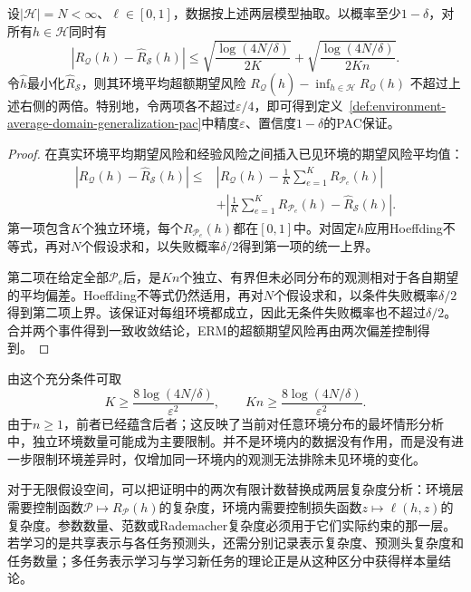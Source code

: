 \begin{theorem}[随机环境中的一致收敛与可学习性]
\label{thm:dg-two-level-sample}
设$|\mathcal H|=N<\infty$、$\ell\in[0,1]$，数据按上述两层模型抽取。以概率至少$1-\delta$，对所有$h\in\mathcal H$同时有
\begin{equation}
 |R_{\mathcal Q}(h)-\widehat R_{\mathcal S}(h)|
 \leq\sqrt{\frac{\log(4N/\delta)}{2K}}
      +\sqrt{\frac{\log(4N/\delta)}{2Kn}}.
 \label{eq:dg-two-level-uniform}
\end{equation}
令$\widehat h$最小化$\widehat R_{\mathcal S}$，则其环境平均超额期望风险
$R_{\mathcal Q}(\widehat h)-\inf_{h\in\mathcal H}R_{\mathcal Q}(h)$
不超过上述右侧的两倍。特别地，令两项各不超过$\varepsilon/4$，即可得到定义~\ref{def:environment-average-domain-generalization-pac}中精度$\varepsilon$、置信度$1-\delta$的PAC保证。
\end{theorem}
\begin{proof}
在真实环境平均期望风险和经验风险之间插入已见环境的期望风险平均值：
\begin{align*}
 |R_{\mathcal Q}(h)-\widehat R_{\mathcal S}(h)|
 \leq{}&\left|R_{\mathcal Q}(h)-\frac1K\sum_{e=1}^K R_{\mathcal P_e}(h)\right|\\
 &+\left|\frac1K\sum_{e=1}^K R_{\mathcal P_e}(h)-\widehat R_{\mathcal S}(h)\right|.
\end{align*}
第一项包含$K$个独立环境，每个$R_{\mathcal P_e}(h)$都在$[0,1]$中。对固定$h$应用Hoeffding不等式，再对$N$个假设求和，以失败概率$\delta/2$得到第一项的统一上界。

第二项在给定全部$\mathcal P_e$后，是$Kn$个独立、有界但未必同分布的观测相对于各自期望的平均偏差。Hoeffding不等式仍然适用，再对$N$个假设求和，以条件失败概率$\delta/2$得到第二项上界。该保证对每组环境都成立，因此无条件失败概率也不超过$\delta/2$。合并两个事件得到一致收敛结论，ERM的超额期望风险再由两次偏差控制得到。
\end{proof}

由这个充分条件可取
\[
 K\geq\frac{8\log(4N/\delta)}{\varepsilon^2},\qquad
 Kn\geq\frac{8\log(4N/\delta)}{\varepsilon^2}.
\]
由于$n\geq1$，前者已经蕴含后者；这反映了当前对任意环境分布的最坏情形分析中，独立环境数量可能成为主要限制。并不是环境内的数据没有作用，而是没有进一步限制环境差异时，仅增加同一环境内的观测无法排除未见环境的变化。

对于无限假设空间，可以把证明中的两次有限计数替换成两层复杂度分析：环境层需要控制函数$\mathcal P\mapsto R_{\mathcal P}(h)$的复杂度，环境内需要控制损失函数$z\mapsto\ell(h,z)$的复杂度。参数数量、范数或Rademacher复杂度必须用于它们实际约束的那一层。若学习的是共享表示与各任务预测头，还需分别记录表示复杂度、预测头复杂度和任务数量；多任务表示学习与学习新任务的理论正是从这种区分中获得样本量结论。

